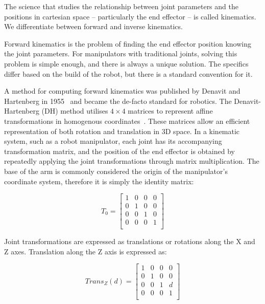 The science that studies the relationship between joint parameters and the positions in cartesian space -- particularly the end effector -- is called kinematics.
We differentiate between forward and inverse kinematics.

Forward kinematics is the problem of finding the end effector position knowing the joint parameters. For manipulators with traditional joints, solving this problem is simple enough, and there is always a unique solution. The specifics differ based on the build of the robot, but there is a standard convention for it.

A method for computing forward kinematics was published by Denavit and Hartenberg in 1955~\cite{dh} and became the de-facto standard for robotics. The Denavit-Hartenberg (DH) method utilises $4\times4$ matrices to represent affine transformations in homogenous coordinates~\cite{nomizu1994affine}.
These matrices allow an efficient representation of both rotation and translation in 3D space.
In a kinematic system, such as a robot manipulator, each joint has its accompanying transformation matrix, and the position of the end effector is obtained by repeatedly applying the joint transformations through matrix multiplication. The base of the arm is commonly considered the origin of the manipulator's coordinate system, therefore it is simply the identity matrix:

\begin{equation}
  T_0 =  \begin{bmatrix}
            1 & 0 & 0 & 0 \\ 0 & 1 & 0 & 0 \\ 0 & 0 & 1 & 0 \\ 0 & 0 & 0 & 1 \\
          \end{bmatrix}
\end{equation}

Joint transformations are expressed as translations or rotations along the X and Z axes.
Translation along the Z axis is expressed as:

\begin{equation}
  Trans_Z(d) = \begin{bmatrix}
                 1 & 0 & 0 & 0 \\ 0 & 1 & 0 & 0 \\ 0 & 0 & 1 & d \\ 0 & 0 & 0 & 1 \\
               \end{bmatrix}
\end{equation}

